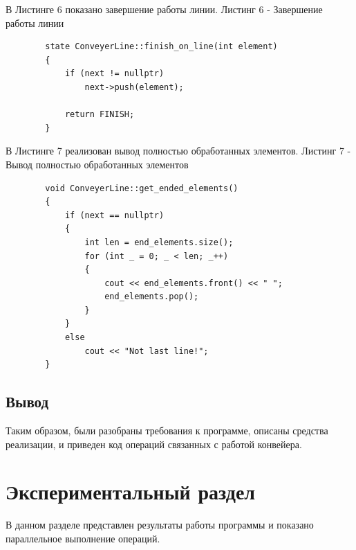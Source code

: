 \documentclass[14pt, a4paper]{extarticle}
\begin{document}
	В Листинге 6 показано завершение работы линии.\newline
	Листинг 6 - Завершение работы линии
	\begin{lstlisting}	
		state ConveyerLine::finish_on_line(int element)
		{
			if (next != nullptr)
				next->push(element);
			
			return FINISH;
		}
	\end{lstlisting}

	В Листинге 7 реализован вывод полностью обработанных элементов.\newline
	Листинг 7 - Вывод полностью обработанных элементов
	\begin{lstlisting}	
		void ConveyerLine::get_ended_elements()
		{
			if (next == nullptr)
			{
				int len = end_elements.size();
				for (int _ = 0; _ < len; _++)
				{
					cout << end_elements.front() << " ";
					end_elements.pop();
				}
			}
			else
				cout << "Not last line!";
		}
	\end{lstlisting}


	\subsection*{Вывод}
	Таким образом, были разобраны требования к программе, описаны средства реализации, и приведен код операций связанных с работой конвейера.
	
	\section{Экспериментальный раздел}
	В данном разделе представлен результаты работы программы и показано параллельное выполнение операций.
\end{document}
